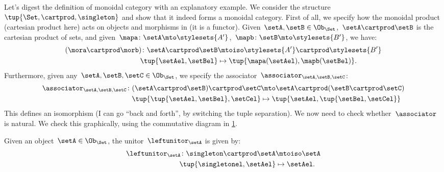 \begin{example}
    Let's digest the definition of monoidal category with an explanatory example.
    We consider the structure~$\tup{\Set,\cartprod,\singleton}$ and show that it indeed forms a monoidal category.
    First of all, we specify how the monoidal product (cartesian product here) acts on objects and morphisms in \Set (it is a functor).
    Given~$\setA,\setB\in \Ob_{\Set}$,~$\setA\cartprod \setB$ is the cartesian product of sets, and given~$\mapa\colon \setA\mto \stylesets{A'}$,~$\mapb\colon \setB\mto \stylesets{B'}$, we have:
    \begin{equation*}
        \label{eq:set_mon_prod_2}
        \begin{aligned}
        (\mora \cartprod \morb)
            \colon \setA\cartprod \setB&\mtoiso \stylesets{A'}\cartprod \stylesets{B'}\\
            \tup{\setAel,\setBel}&\mapsto \tup{\mapa(\setAel),\mapb(\setBel)}.
        \end{aligned}
    \end{equation*}
    Furthermore, given any~$\setA,\setB,\setC\in \Ob_{\Set}$, we specify the associator~$\associator_{\setA,\setB,\setC}$:
    \begin{equation*}
        \label{eq:set_mon_prod_3}
        \begin{aligned}
            \associator_{\setA,\setB,\setC}\colon (\setA\cartprod \setB)\cartprod \setC&\mto \setA\cartprod (\setB\cartprod \setC)\\
            \tup{\tup{\setAel,\setBel},\setCel}&\mapsto \tup{\setAel,\tup{\setBel,\setCel}}
        \end{aligned}
    \end{equation*}
    This defines an isomorphism (I can go ``back and forth'', by switching the tuple separation).
    We now need to check whether~$\associator$ is natural.
    We check this graphically, using the commutative diagram in \cref{fig:monoidal_set_ass_nat}.
    
    \begin{figure}[h!]
        \centering
        \caption{}
        \label{fig:monoidal_set_ass_nat}
    \end{figure}
    
    Given an object~$\setA\in \Ob_\Set$, the unitor~$\leftunitor_\setA$ is given by:
    \begin{equation*}
        \label{eq:set_mon_prod_4}
        \begin{aligned}
            \leftunitor_\setA\colon \singleton \cartprod \setA &\mtoiso \setA\\
            \tup{\singletonel,\setAel}&\mapsto \setAel.
        \end{aligned}
    \end{equation*}
    

\end{example}
